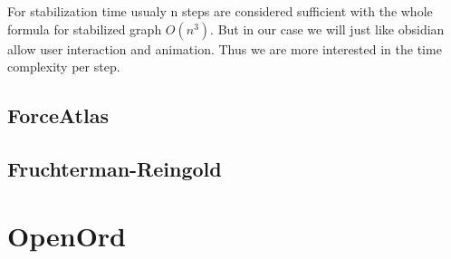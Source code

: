 For stabilization time usualy n steps are considered sufficient with the whole formula for stabilized graph $O(n^3)$.
But in our case we will just like obsidian allow user interaction and animation.
Thus we are more interested in the time complexity per step.

\subsection{ForceAtlas}


\subsection{Fruchterman-Reingold}

\section{OpenOrd}

